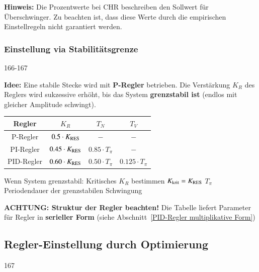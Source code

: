 \textbf{Hinweis:} Die Prozentwerte bei CHR beschreiben den Sollwert für Überschwinger.
Zu beachten ist, dass diese Werte durch die empirischen Einstellregeln nicht garantiert werden.


\subsubsection{Einstellung via Stabilitätsgrenze}{166-167}

\textbf{Idee:} Eine stabile Stecke wird mit \textbf{P-Regler} betrieben. Die Verstärkung $K_R$ des Reglers wird sukzessive erhöht,
bis das System \textbf{grenzstabil ist} (endlos mit gleicher Amplitude schwingt).

\begin{minipage}[c]{0.55\columnwidth}
    \begin{tabular}{c c c c}
        \toprule
        Regler      & $K_R$                     & $T_N$                 & $T_V$                 \\
        \toprule
        P-Regler    & $0.5 \cdot K_{\rm RES}$   & $-$                   & $-$                   \\
        \midrule
        PI-Regler   & $0.45 \cdot K_{\rm RES}$  & $0.85 \cdot T_{\pi}$  & $-$                   \\
        \midrule
        PID-Regler  & $0.60 \cdot K_{\rm RES}$  & $0.50 \cdot T_{\pi}$  & $0.125 \cdot T_{\pi}$ \\
        \bottomrule
    \end{tabular}
\end{minipage}
\hfill
\begin{minipage}[c]{0.42\columnwidth}
    \begin{center}
        \textbf{}
    \end{center}

    \begin{outline}
        \1 Wenn System grenzstabil: Kritisches $K_R$ bestimmen
            \2 $K_{\rm krit} = K_{\rm RES}$
        \1 $T_{\pi}$ Periodendauer der grenzstabilen Schwingung 
    \end{outline}
\end{minipage}

\textbf{ACHTUNG: Struktur der Regler beachten!} Die Tabelle liefert Parameter für Regler in \textbf{serieller Form}
(siehe Abschnitt~\ref{PID-Regler multiplikative Form}) 


\subsection{Regler-Einstellung durch Optimierung}{167}

